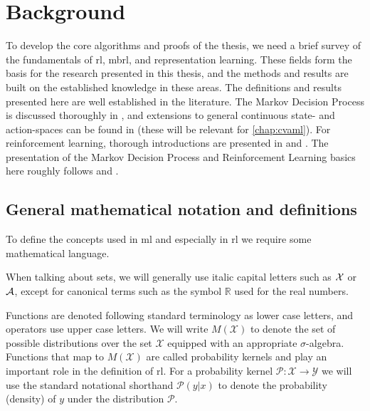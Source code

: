 \chapter{Background}
\label{chap:background}


To develop the core algorithms and proofs of the thesis, we need a brief survey of the fundamentals of \ac{rl}, \ac{mbrl}, and representation learning.
These fields form the basis for the research presented in this thesis, and the methods and results are built on the established knowledge in these areas.
The definitions and results presented here are well established in the literature.
The Markov Decision Process is discussed thoroughly in \parencite{puterman1994markov}, and extensions to general continuous state- and action-spaces can be found in \textcite{bertsekasshreve1978} (these will be relevant for \autoref{chap:cvaml}).
For reinforcement learning, thorough introductions are presented in \textcite{suttonbook} and \textcite{farahmand2021}.
The presentation of the Markov Decision Process and Reinforcement Learning basics here roughly follows \textcite{farahmand2011thesis} and \textcite{farahmand2021}.


\section{General mathematical notation and definitions}
To define the concepts used in \ac{ml} and especially in \ac{rl} we require some mathematical language.

When talking about sets, we will generally use italic capital letters such as $\mathcal{X}$ or $\mathcal{A}$, except for canonical terms such as the symbol $\mathbb{R}$ used for the real numbers.

Functions are denoted following standard terminology as lower case letters, and operators use upper case letters.
We will write $M(\mathcal{X})$ to denote the set of possible distributions over the set $\mathcal{X}$ equipped with an appropriate $\sigma$-algebra.
Functions that map to $M(\mathcal{X})$ are called probability kernels and play an important role in the definition of \ac{rl}.
For a probability kernel $\mathcal{P}: \mathcal{X} \rightarrow \mathcal{Y}$ we will use the standard notational shorthand $\mathcal{P}(y|x)$ to denote the probability (density) of $y$ under the distribution $\mathcal{P}$.

